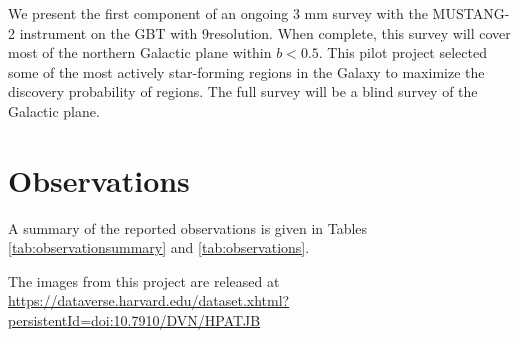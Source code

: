 \documentclass[twocolumn]{aastex62}
\newcommand{\MUSTANG}{MUSTANG-2\xspace}
\begin{document}

We present the first component of an ongoing 3 mm survey with the \MUSTANG
instrument on the GBT with 9\arcsec resolution.   When complete, this survey
will cover most of the northern Galactic plane within $b<0.5$.  
This pilot project selected some of the most actively star-forming regions in
the Galaxy to maximize the discovery probability of \hchii regions.  The full
survey will be a blind survey of the Galactic plane.


\section{Observations}

A summary of the reported observations is given in Tables \ref{tab:observationsummary} and \ref{tab:observations}.

The images from this project are released at
\url{https://dataverse.harvard.edu/dataset.xhtml?persistentId=doi:10.7910/DVN/HPATJB}
\end{document}
